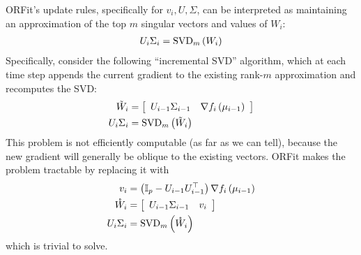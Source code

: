ORFit's update rules, specifically for $v_{i},U,\Sigma$, can be interpreted as maintaining an approximation of the top $m$ singular vectors and values of $W_{i}$:
\begin{align}
U_{i}\Sigma_{i}	={\rm SVD}_{m}\left(W_{i}\right)
\end{align}
Specifically, consider the following “incremental SVD” algorithm, which at each time step appends the current gradient to the existing rank-$m$ approximation and recomputes the SVD:
\begin{align}
\tilde{W}_{i}	&= \left[\begin{array}{cc} U_{i-1}\Sigma_{i-1} & \nabla f_{i}\left(\mu_{i-1}\right)\end{array}\right] \label{eq:W-tilde}\\
U_{i}\Sigma_{i}	&= {\rm SVD}_{m}\left(\tilde{W}_{i}\right)
\end{align}
This problem is not efficiently computable (as far as we can tell), because the new gradient will generally be oblique to the existing vectors. ORFit makes the problem tractable by replacing it with
\begin{align}
    v_{i}	&=\left(\mathbb{I}_{p}-U_{i-1}U_{i-1}^{\top}\right)\nabla f_{i}\left(\mu_{i-1}\right) \\
    \ring{W}_{i}	&=\left[\begin{array}{cc} U_{i-1}\Sigma_{i-1} & v_{i}\end{array}\right] \\
    U_{i}\Sigma_{i}	&={\rm SVD}_{m}\left(\ring{W}_{i}\right)
\end{align}
which is trivial to solve.

